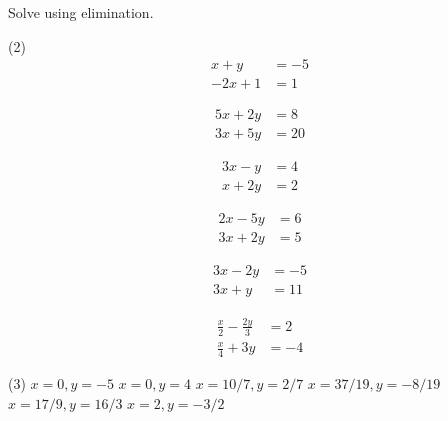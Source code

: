 \documentclass[12pt,fleqn]{book}
\newcommand{\prb}[1]{\begin{Exercise}#1\end{Exercise}}
\newcommand{\sol}[1]{\begin{Answer}#1\end{Answer}}
\begin{document}
\prb{Solve using elimination.
\begin{tasks}(2)
\task \vspace{-2.5em}
\begin{align*}
x+y   &=-5 \\
-2x+1 &=1
\end{align*}

\vspace{2in}

\task \vspace{-2.5em}
\begin{align*}
5x+2y  &= 8 \\
3x+5y  &= 20
\end{align*}

\vspace{2in}

\task \vspace{-2.5em}
\begin{align*}
3x-y  &= 4 \\
x + 2y &=2
\end{align*}

\vspace{2in}

\task \vspace{-2.5em}
\begin{align*}
2x-5y &= 6 \\
3x+2y &= 5
\end{align*}

\vspace{2in}

\task \vspace{-2.5em}
\begin{align*}
3x-2y&=-5 \\
3x+y &=11
\end{align*}

\vspace{2in}

\task \vspace{-2.5em}
\begin{align*}
\frac x2 - \frac {2y}{3} &= 2 \\
\frac x4 + 3y &= -4
\end{align*}

\vspace{2in}

\end{tasks}
}
\sol{
\begin{tasks}(3)
    \task $x=0, y=-5$
    \task $x=0, y=4$
    \task $x=10/7, y=2/7$
    \task $x=37/19, y=-8/19$
    \task $x=17/9, y=16/3$
    \task $x=2, y=-3/2$
\end{tasks}
}
\end{document}
